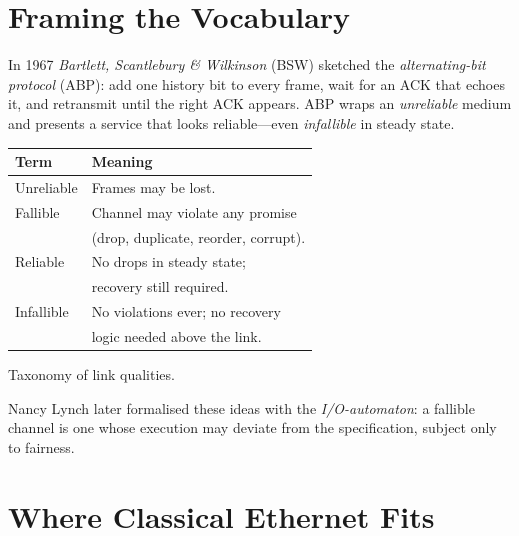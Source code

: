 {{{{{{%

\section{Framing the Vocabulary}

In 1967 \emph{Bartlett, Scantlebury \& Wilkinson} (BSW) sketched the
\emph{alternating-bit protocol} (ABP): add one history bit to every frame,
wait for an ACK that echoes it, and retransmit until the right ACK appears.
ABP wraps an \emph{unreliable} medium and presents a service that looks
reliable---even \emph{infallible} in steady state.

\begin{marginfigure}
  \footnotesize
  \centering
  \begin{tabular}{@{}l@{~}l@{}}
    \toprule
    Term & Meaning\\
    \midrule
    Unreliable & Frames may be lost.\\
    Fallible   & Channel may violate any promise\\
               & (drop, duplicate, reorder, corrupt).\\
    Reliable   & No drops in steady state;\\
               & recovery still required.\\
    Infallible & No violations ever; no recovery\\
               & logic needed above the link.\\
    \bottomrule
  \end{tabular}
  \caption{Taxonomy of link qualities.\label{tab:taxonomy}}
\end{marginfigure}

Nancy Lynch later formalised these ideas with the
\emph{I/O-automaton}: a fallible channel is one whose execution may
deviate from the specification, subject only to fairness.

\section{Where Classical Ethernet Fits}

}}}}}}
